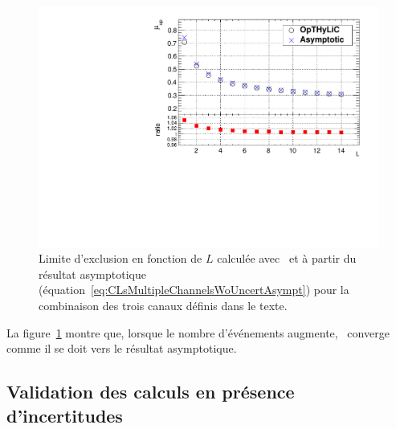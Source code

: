 \begin{figure}[!htb]
\begin{center}
\includegraphics[scale=0.5]{figures/MultipleChannelsNoUncertainties_OTHVsAsymptotic.pdf}
\caption{Limite d'exclusion en fonction de $L$ calcul\'ee avec \opthylic~et \`a partir du r\'esultat asymptotique (\'equation~\ref{eq:CLsMultipleChannelsWoUncertAsympt}) pour la combinaison des trois canaux d\'efinis dans le texte. \label{fig:ThreeChannelExampleAsympt}}
\end{center}
\end{figure}

La figure~\ref{fig:ThreeChannelExampleAsympt} montre que, lorsque le nombre d'\'ev\'enements augmente, \opthylic~converge comme il se doit vers le r\'esultat asymptotique.

\subsection{Validation des calculs en pr\'esence d'incertitudes}
\label{sec:validOTHsyste}

